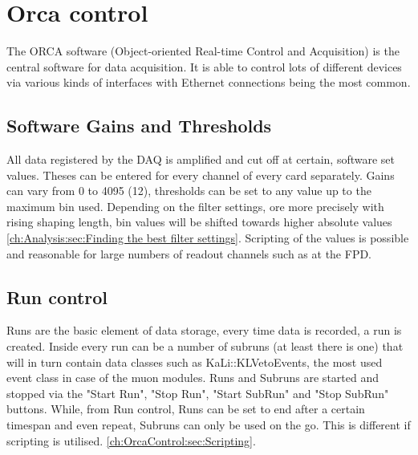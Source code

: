 
  \section{Orca control}
  \label{ch:OrcaControl}
  The ORCA software (Object-oriented Real-time Control and Acquisition) \cite{How09} is the central software for data acquisition. It is able to control lots of different devices via various kinds of interfaces with Ethernet connections being the most common.

    \subsection{Software Gains and Thresholds}
    \label{ch:OrcaControl:sec:SoftwareGainsThresholds}
    All data registered by the DAQ is amplified and cut off at certain, software set values. Theses can be entered for every channel of every card separately. Gains can vary from \SI{0}{} to \SI{4095}{} (\SI{12}{\bit}), thresholds can be set to any value up to the maximum bin used. Depending on the filter settings, ore more precisely with rising shaping length, bin values will be shifted  towards higher absolute values \ref{ch:Analysis:sec:Finding the best filter settings}.
    Scripting of the values is possible and reasonable for large numbers of readout channels such as at the FPD.
    
    \subsection{Run control}
    \label{ch:OrcaControl:sec:RunControl}
    Runs are the basic element of data storage, every time data is recorded, a run is created. Inside every run can be a number of subruns (at least there is one) that will in turn contain data classes such as KaLi::KLVetoEvents, the most used event class in case of the muon modules. Runs and Subruns are started and stopped via the "Start Run", "Stop Run", "Start SubRun" and "Stop SubRun" buttons. While, from Run control, Runs can be set to end after a certain timespan and even repeat, Subruns can only be used on the go. This is different if scripting is utilised. \ref{ch:OrcaControl:sec:Scripting}.
    
